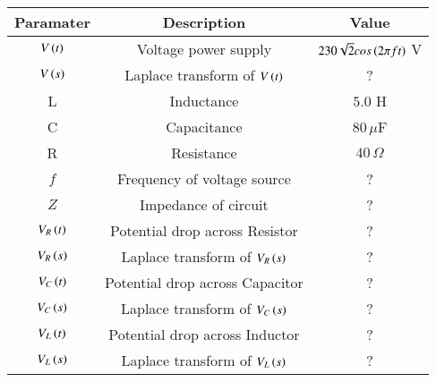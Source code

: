 \begin{tabular}{|c|c|c|}
\hline
\textbf{Paramater} & \textbf{Description} & \textbf{Value}  \\ \hline
$V\left(t\right)$ & Voltage power supply & $230\sqrt{2} cos\left(2\pi f t\right)$ V  \\ \hline
$V\left(s\right)$ & Laplace transform of $V\left(t\right)$ & ? \\\hline
L & Inductance & $5.0$ H  \\ \hline
C & Capacitance & $80\,\mu$F \\ \hline
R & Resistance & $40\,\Omega$ \\ \hline
$f$ & Frequency of voltage source & ? \\ \hline 
$Z$ & Impedance of circuit & ? \\ \hline
$V_R\left(t\right)$ & Potential drop across Resistor & ?\\ \hline
$V_R\left(s\right)$ & Laplace transform of $V_R\left(s\right)$ & ?\\\hline
$V_C\left(t\right)$ & Potential drop across Capacitor & ?\\ \hline
$V_C\left(s\right)$ & Laplace transform of $V_C\left(s\right)$ & ?\\\hline
$V_L\left(t\right)$ & Potential drop across Inductor & ?\\ \hline
$V_L\left(s\right)$ & Laplace transform of $V_L\left(s\right)$ & ?\\\hline
\end{tabular}
